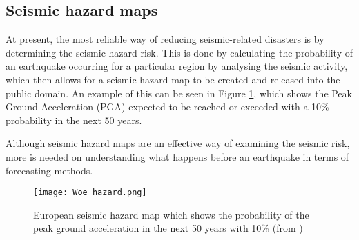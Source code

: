 \documentclass[12pt]{report}
\begin{document}

\subsection{Seismic hazard maps}

At present, the most reliable way of reducing seismic-related disasters is by determining the seismic hazard risk. This is done by calculating the probability of an earthquake occurring for a particular region by analysing the seismic activity, which then allows for a seismic hazard map to be created and released into the public domain. An example of this can be seen in Figure \ref{Woe_hazard}, which shows the Peak Ground Acceleration (PGA) expected to be reached or exceeded with a 10\% probability in the next 50 years.

Although seismic hazard maps are an effective way of examining the seismic risk, more is needed on understanding what happens before an earthquake in terms of forecasting methods. 

\begin{figure}[h!]
	\begin{center}
		\texttt{[image: Woe\_hazard.png]}
		\caption{European seismic hazard map which shows the probability of the peak ground acceleration in the next 50 years with 10\% (from \cite{Giardini2013})}
		\label{Woe_hazard}
	\end{center}
\end{figure}
\end{document}
